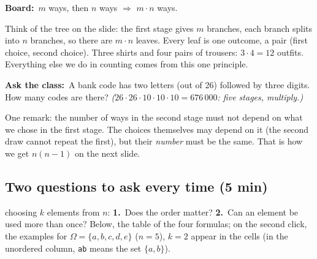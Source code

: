 \documentclass[11pt,a4paper,parskip=half]{scrartcl}
\newcommand{\Om}{\Omega}
\newcommand{\board}{\textbf{\color{gold}Board:}\ }
\newcommand{\ask}{\textbf{\color{navy}Ask the class:}\ }
\begin{document}
\board $m$ ways, then $n$ ways $\Rightarrow$ $m\cdot n$ ways.

Think of the tree on the slide: the first stage gives $m$ branches, each
branch splits into $n$ branches, so there are $m\cdot n$ leaves. Every leaf
is one outcome, a pair (first choice, second choice). Three shirts and four
pairs of trousers: $3\cdot4=12$ outfits. Everything else we do in counting
comes from this one principle.

\ask A bank code has two letters (out of 26) followed by three digits. How
many codes are there? \emph{($26\cdot26\cdot10\cdot10\cdot10=676\,000$: five
stages, multiply.)}

One remark: the number of ways in the second stage must not depend on what
we chose in the first stage. The choices themselves may depend on it (the
second draw cannot repeat the first), but their \emph{number} must be the
same. That is how we get $n(n-1)$ on the next slide.

\needspace{0.35\textheight}
\subsection{Two questions to ask every time (5 min)}

\begin{onslide}
	choosing $k$ elements from $n$: \textbf{1.}~Does the order matter?
	\textbf{2.}~Can an element be used more than once? Below, the table of the
	four formulas; on the second click, the examples for
	$\Om=\{a,b,c,d,e\}$ ($n=5$), $k=2$ appear in the cells (in the unordered
	column, \texttt{ab} means the set $\{a,b\}$).
\end{onslide}
\end{document}
